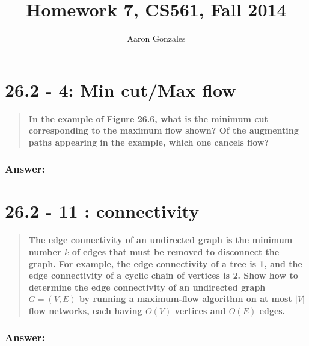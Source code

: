 \documentclass[titlepage]{article}\usepackage[]{graphicx}\usepackage[]{color}
\begin{document}
\title{Homework 7, CS561, Fall 2014}
\author{Aaron Gonzales}
\maketitle


\section{26.2 - 4: Min cut/Max flow}
  \begin{quote}
    \textbf{In the example of Figure 26.6, what is the minimum cut corresponding
    to the maximum flow shown? Of the augmenting paths appearing in the
  example, which one cancels flow?}
  \end{quote}

  \subsubsection{Answer:}


\section{26.2 - 11 : connectivity}
  \begin{quote}
    \textbf{The edge connectivity of an undirected graph is the minimum number
      $k$
    of edges that must be removed to disconnect the graph. For example, the edge
  connectivity of a tree is 1, and the edge connectivity of a cyclic chain of
  vertices is 2. Show how to determine the edge connectivity of an undirected
  graph $G = (V,E) $ by running a maximum-flow algorithm on at most $|V|$ flow
  networks, each having $O(V)$ vertices and $O(E)$ edges.}
  \end{quote}

  \subsubsection{Answer:}
\end{document}
